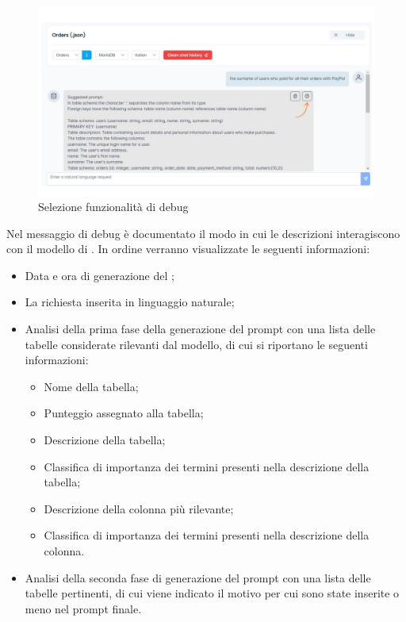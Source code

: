 \begin{figure}[H]
  \centering
  \includegraphics[width=\textwidth]{assets/tasto_info_debug.png}
  \caption{Selezione funzionalità di debug}
\end{figure}

\par Nel messaggio di debug è documentato il modo in cui le descrizioni interagiscono con il modello di . In ordine verranno visualizzate le seguenti informazioni: 
\begin{itemize}
  \item Data e ora di generazione del ; 
  \item La richiesta inserita in linguaggio naturale;
  \item Analisi della prima fase della generazione del prompt con una lista delle tabelle considerate rilevanti dal modello, di cui si riportano le seguenti informazioni:
  \begin{itemize}
    \item Nome della tabella;
    \item Punteggio assegnato alla tabella;
    \item Descrizione della tabella;
    \item Classifica di importanza dei termini presenti nella descrizione della tabella;
    \item Descrizione della colonna più rilevante;
    \item Classifica di importanza dei termini presenti nella descrizione della colonna.
  \end{itemize}
  \item Analisi della seconda fase di generazione del prompt con una lista delle tabelle pertinenti, di cui viene indicato il motivo per cui sono state inserite o meno nel prompt finale.
\end{itemize}

